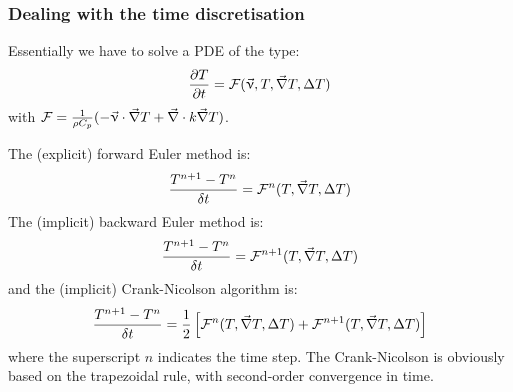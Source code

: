 
\subsubsection{Dealing with the time discretisation}

Essentially we have to solve a PDE of the type:
\[
\frac{\partial T}{\partial t} = {\cal F}(\vec \upnu,T,\vec\nabla T,\Delta T)
\]
with ${\cal F}=\frac{1}{\rho C_p}(-\vec\upnu\cdot\vec\nabla T + \vec\nabla\cdot k\vec\nabla T)$.


The (explicit) forward Euler method is:
\[
\frac{T^{n+1}-T^n}{\delta t} = {\cal F}^n(T,\vec\nabla T,\Delta T)
\]
The (implicit) backward Euler method is:
\[
\frac{T^{n+1}-T^n}{\delta t} = {\cal F}^{n+1}(T,\vec\nabla T,\Delta T)
\]
and the (implicit) Crank-Nicolson algorithm is:
\[
\frac{T^{n+1}-T^n}{\delta t} = 
\frac{1}{2}
\left[
{\cal F}^{n}(T,\vec\nabla T,\Delta T)
+
{\cal F}^{n+1}(T,\vec\nabla T,\Delta T)
\right]
\]
where the superscript $n$ indicates the time step.
The Crank-Nicolson is obviously based on the trapezoidal rule, with second-order convergence in time.


